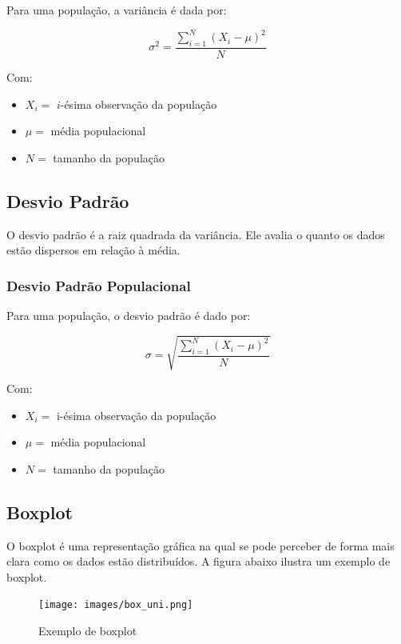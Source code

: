 \documentclass[
]{estat/estat}
\begin{document}
Para uma população, a variância é dada por:

\[\sigma^2=\frac{\sum\limits_{i=1}^{N}\left(X_i - \mu\right)^2}{N}\]

Com:

\begin{itemize}
\item
  \(X_i =\) \(i\)-ésima observação da população
\item
  \(\mu =\) média populacional
\item
  \(N =\) tamanho da população
\end{itemize}

\subsection{Desvio Padrão}\label{desvio-padruxe3o}

O desvio padrão é a raiz quadrada da variância. Ele avalia o quanto os
dados estão dispersos em relação à média.

\subsubsection{Desvio Padrão
Populacional}\label{desvio-padruxe3o-populacional}

Para uma população, o desvio padrão é dado por:

\[\sigma=\sqrt{\frac{\sum\limits_{i=1}^{N}\left(X_i - \mu\right)^2}{N}}\]

Com:

\begin{itemize}
\item
  \(X_i =\) i-ésima observação da população
\item
  \(\mu =\) média populacional
\item
  \(N =\) tamanho da população
\end{itemize}

\subsection{Boxplot}\label{boxplot}

O boxplot é uma representação gráfica na qual se pode perceber de forma
mais clara como os dados estão distribuídos. A figura abaixo ilustra um
exemplo de boxplot.

\begin{figure}[H]

\caption{Exemplo de boxplot}

{\centering \texttt{[image: images/box\_uni.png]}

}

\end{figure}%
\end{document}
